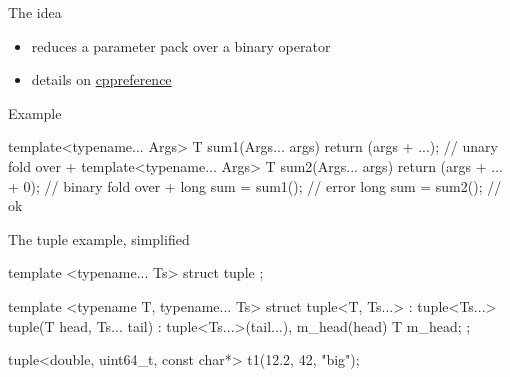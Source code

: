 \begin{frame}[fragile]
  \begin{block}{The idea}
    \begin{itemize}
      \item reduces a parameter pack over a binary operator
      \item details on \href{https://en.cppreference.com/w/cpp/language/fold}{cppreference}
    \end{itemize}
  \end{block}
  \begin{exampleblock}{Example}
    \begin{cppcode*}{}
      template<typename... Args>
      T sum1(Args... args) {
        return (args + ...);     // unary fold over +
      }
      template<typename... Args>
      T sum2(Args... args) {
        return (args + ... + 0); // binary fold over +
      }
      long sum = sum1(); // error
      long sum = sum2(); // ok
    \end{cppcode*}
  \end{exampleblock}
\end{frame}

\begin{frame}[fragile]
  \begin{block}{The tuple example, simplified}
    \begin{cppcode*}{}
      template <typename... Ts>
      struct tuple {};

      template <typename T, typename... Ts>
      struct tuple<T, Ts...> : tuple<Ts...> {
        tuple(T head, Ts... tail) :
          tuple<Ts...>(tail...), m_head(head) {}
        T m_head;
      };

      tuple<double, uint64_t, const char*>
        t1(12.2, 42, "big");
    \end{cppcode*}
  \end{block}
\end{frame}

